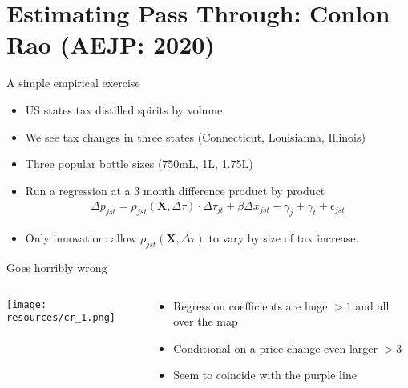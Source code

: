 \section{Estimating Pass Through: Conlon Rao (AEJP: 2020)}

\begin{frame}{A simple empirical exercise}
\begin{itemize}
\item US states tax distilled spirits by volume
\item We see tax changes in three states (Connecticut, Louisianna, Illinois)
\item Three popular bottle sizes (750mL, 1L, 1.75L)
\item Run a regression at a 3 month difference product by product
\begin{align*}
\Delta p_{j s t}=\rho_{j s t}(\symbf{X}, \Delta \tau) \cdot \Delta \tau_{j t}+\beta \Delta x_{j s t}+\gamma_j+\gamma_t+\epsilon_{j s t}
\end{align*}
\item Only innovation: allow $\rho_{j s t}(\symbf{X}, \Delta \tau) $ to vary by size of tax increase.
\end{itemize}
\end{frame}


\begin{frame}{Goes horribly wrong}
\begin{columns}
\begin{column}{0.4\textwidth}
\texttt{[image: resources/cr\_1.png]}
\end{column}
\begin{column}{0.5\textwidth}
\begin{itemize}
\item Regression coefficients are huge $>1$ and all over the map
\item Conditional on a price change even larger $>3$
\item Seem to coincide with the purple line 
\end{itemize}
\end{column}
\end{columns}
\end{frame}


